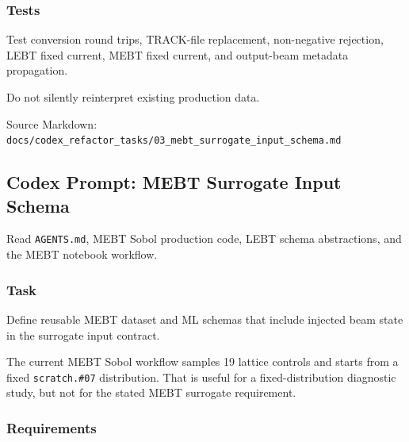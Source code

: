 \documentclass[
]{article}
\begin{document}
\hypertarget{tests-1}{%
\subsubsection{Tests}\label{tests-1}}

Test conversion round trips, TRACK-file replacement, non-negative
rejection, LEBT fixed current, MEBT fixed current, and output-beam
metadata propagation.

Do not silently reinterpret existing production data.

Source Markdown:
\texttt{docs/codex\_refactor\_tasks/03\_mebt\_surrogate\_input\_schema.md}

\hypertarget{codex-prompt-mebt-surrogate-input-schema}{%
\subsection{Codex Prompt: MEBT Surrogate Input
Schema}\label{codex-prompt-mebt-surrogate-input-schema}}

Read \texttt{AGENTS.md}, MEBT Sobol production code, LEBT schema
abstractions, and the MEBT notebook workflow.

\hypertarget{task-2}{%
\subsubsection{Task}\label{task-2}}

Define reusable MEBT dataset and ML schemas that include injected beam
state in the surrogate input contract.

The current MEBT Sobol workflow samples 19 lattice controls and starts
from a fixed \texttt{scratch.\#07} distribution. That is useful for a
fixed-distribution diagnostic study, but not for the stated MEBT
surrogate requirement.

\hypertarget{requirements-2}{%
\subsubsection{Requirements}\label{requirements-2}}
\end{document}
